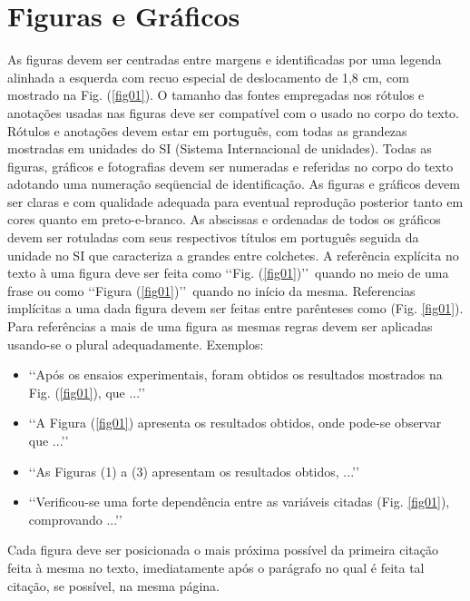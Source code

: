 \section{Figuras e Gráficos}
As figuras devem ser centradas entre margens e identificadas por uma legenda
alinhada a esquerda com recuo especial de deslocamento de 1,8 cm, com mostrado
na Fig. (\ref{fig01}). O tamanho das fontes empregadas nos rótulos e anotações
usadas nas figuras deve ser compatível com o usado no corpo do texto. Rótulos e
anotações devem estar em português, com todas as grandezas mostradas em
unidades do SI (Sistema Internacional de unidades).
Todas as figuras, gráficos e fotografias devem ser numeradas e referidas no
corpo do texto adotando uma numeração seqüencial de identificação. As figuras e
gráficos devem ser claras e com qualidade adequada para eventual reprodução
posterior tanto em cores quanto em preto-e-branco.
As abscissas e ordenadas de todos os gráficos devem ser rotuladas com seus
respectivos títulos em português seguida da unidade no SI que caracteriza a
grandes entre colchetes.
A referência explícita no texto à uma figura deve ser feita como
\lq\lq Fig. (\ref{fig01})\rq\rq\ quando no meio de uma frase ou como
\lq\lq Figura (\ref{fig01})\rq\rq\ quando no início da mesma. Referencias
implícitas a uma dada figura devem ser feitas entre parênteses como
(Fig. \ref{fig01}). Para referências a mais de uma figura as mesmas regras
devem ser aplicadas usando-se o plural adequadamente. Exemplos:
\begin{itemize}
\item \lq\lq Após os ensaios experimentais, foram obtidos os resultados
mostrados na Fig. (\ref{fig01}), que ...\rq\rq
\item \lq\lq A Figura (\ref{fig01}) apresenta os resultados obtidos, onde
pode-se observar que ...\rq\rq
\item \lq\lq As Figuras (1) a (3) apresentam os resultados obtidos,
...\rq\rq
\item \lq\lq Verificou-se uma forte dependência entre as variáveis citadas
(Fig. \ref{fig01}), comprovando ...\rq\rq
\end{itemize}
Cada figura deve ser posicionada o mais próxima possível da primeira citação
feita à mesma no texto, imediatamente após o parágrafo no qual é feita tal
citação, se possível, na mesma página.
